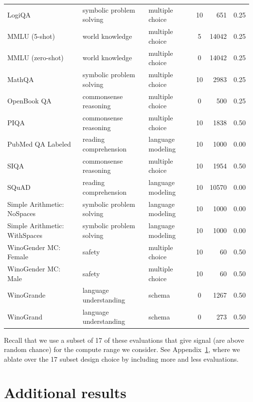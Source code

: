 \documentclass[dvipsnames,11pt]{article}
\begin{document}
\begin{appendix}
\begin{table}[t!]
\begin{tabular}{lllcrc}
LogiQA~\cite{Liu2020LogiQAAC} & symbolic problem solving & multiple choice & 10 & 651 & 0.25\\
MMLU (5-shot)~\cite{mmlu} & world knowledge & multiple choice & 5 & 14042 & 0.25\\
MMLU (zero-shot)~\cite{mmlu} & world knowledge & multiple choice & 0 & 14042 & 0.25\\
MathQA~\cite{mathqa} & symbolic problem solving & multiple choice & 10 & 2983 & 0.25\\
OpenBook QA~\cite{OpenBookQA2018} & commonsense reasoning & multiple choice & 0 & 500 & 0.25\\
PIQA~\cite{piqa} & commonsense reasoning & multiple choice & 10 & 1838 & 0.50\\
PubMed QA Labeled~\cite{pubmed} & reading comprehension & language modeling & 10 & 1000 & 0.00\\
SIQA~\cite{siqa} & commonsense reasoning & multiple choice & 10 & 1954 & 0.50\\
SQuAD~\cite{squad} & reading comprehension & language modeling & 10 & 10570 & 0.00\\
Simple Arithmetic: NoSpaces~\cite{mosaicml} & symbolic problem solving & language modeling & 10 & 1000 & 0.00\\
Simple Arithmetic: WithSpaces~\cite{mosaicml} & symbolic problem solving & language modeling & 10 & 1000 & 0.00\\
WinoGender MC: Female~\cite{winogender} & safety & multiple choice & 10 & 60 & 0.50\\
WinoGender MC: Male~\cite{winogender} & safety & multiple choice & 10 & 60 & 0.50\\
WinoGrande~\cite{sakaguchi2019winogrande} & language understanding & schema & 0 & 1267 & 0.50\\
WinoGrand~\cite{winograd} & language understanding & schema & 0 & 273 & 0.50\\
\bottomrule
\end{tabular}
\label{tab:eval_info}
\end{table}
Recall that we use a subset of 17 of these evaluations that give signal (are above random chance) for the compute range we consider.
See Appendix~\ref{appx:more_results}, where we ablate over the 17 subset design choice by including more and less evaluations.

\section{Additional results}
\label{appx:more_results}


\end{appendix}
\end{document}
